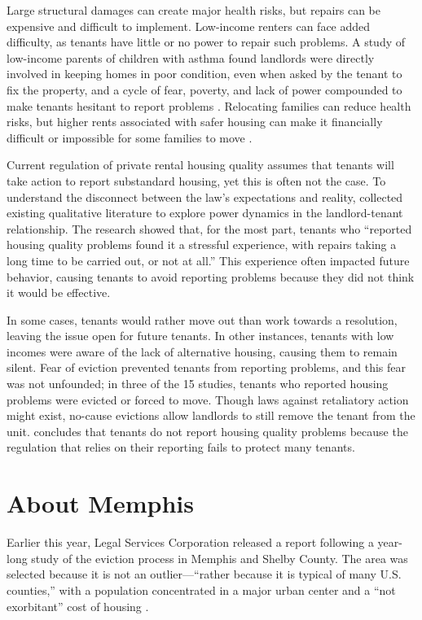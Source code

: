 \documentclass[
]{book}
\begin{document}
Large structural damages can create major health risks, but repairs can be expensive and difficult to implement. Low-income renters can face added difficulty, as tenants have little or no power to repair such problems. A study of low-income parents of children with asthma found landlords were directly involved in keeping homes in poor condition, even when asked by the tenant to fix the property, and a cycle of fear, poverty, and lack of power compounded to make tenants hesitant to report problems \citep{grineski2010}. Relocating families can reduce health risks, but higher rents associated with safer housing can make it financially difficult or impossible for some families to move \citep{mclaine2006}.

Current regulation of private rental housing quality assumes that tenants will take action to report substandard housing, yet this is often not the case. To understand the disconnect between the law's expectations and reality, \citet{chisholm2018} collected existing qualitative literature to explore power dynamics in the landlord-tenant relationship. The research showed that, for the most part, tenants who ``reported housing quality problems found it a stressful experience, with repairs taking a long time to be carried out, or not at all.'' This experience often impacted future behavior, causing tenants to avoid reporting problems because they did not think it would be effective.

In some cases, tenants would rather move out than work towards a resolution, leaving the issue open for future tenants. In other instances, tenants with low incomes were aware of the lack of alternative housing, causing them to remain silent. Fear of eviction prevented tenants from reporting problems, and this fear was not unfounded; in three of the 15 studies, tenants who reported housing problems were evicted or forced to move. Though laws against retaliatory action might exist, no-cause evictions allow landlords to still remove the tenant from the unit. \citet{chisholm2018} concludes that tenants do not report housing quality problems because the regulation that relies on their reporting fails to protect many tenants.

\hypertarget{about-memphis}{%
\chapter{About Memphis}\label{about-memphis}}

Earlier this year, Legal Services Corporation released a report following a year-long study of the eviction process in Memphis and Shelby County. The area was selected because it is not an outlier---``rather because it is typical of many U.S. counties,'' with a population concentrated in a major urban center and a ``not exorbitant'' cost of housing \citep{ahmed2021}.
\end{document}
